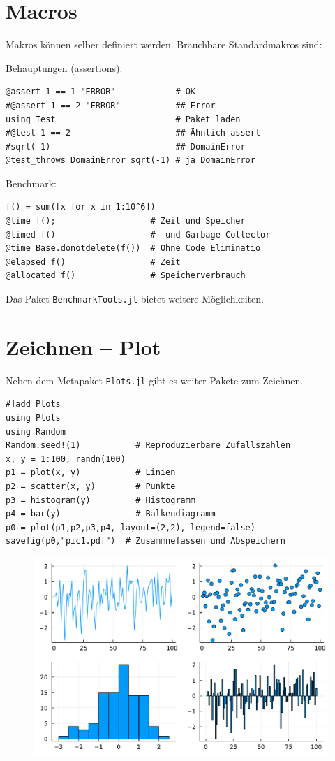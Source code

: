 \documentclass[10pt,twocolumn]{scrartcl}
\begin{document}
\section{Macros}
\label{sec:macros}

Makros können selber definiert werden. Brauchbare Standardmakros sind:

Behauptungen (assertions):
\begin{lstlisting}
@assert 1 == 1 "ERROR"            # OK
#@assert 1 == 2 "ERROR"           ## Error
using Test                        # Paket laden
#@test 1 == 2                     ## Ähnlich assert
#sqrt(-1)                         ## DomainError
@test_throws DomainError sqrt(-1) # ja DomainError
\end{lstlisting}

Benchmark:
\begin{lstlisting}
f() = sum([x for x in 1:10^6])
@time f();                   # Zeit und Speicher
@timed f()                   #  und Garbage Collector
@time Base.donotdelete(f())  # Ohne Code Eliminatio
@elapsed f()                 # Zeit
@allocated f()               # Speicherverbrauch
\end{lstlisting}
Das Paket \lstinline|BenchmarkTools.jl| bietet weitere Möglichkeiten.

\section{Zeichnen -- Plot}
\label{sec:plot}

Neben dem Metapaket \lstinline|Plots.jl| gibt es weiter Pakete zum Zeichnen.
\begin{lstlisting}
#]add Plots
using Plots
using Random
Random.seed!(1)           # Reproduzierbare Zufallszahlen
x, y = 1:100, randn(100)
p1 = plot(x, y)           # Linien
p2 = scatter(x, y)        # Punkte
p3 = histogram(y)         # Histogramm
p4 = bar(y)               # Balkendiagramm
p0 = plot(p1,p2,p3,p4, layout=(2,2), legend=false)
savefig(p0,"pic1.pdf")  # Zusammnefassen und Abspeichern
\end{lstlisting}

\begin{figure}[h]
  \centering
  \includegraphics[width=.95\columnwidth]{pic.pdf}
\end{figure}
\end{document}
